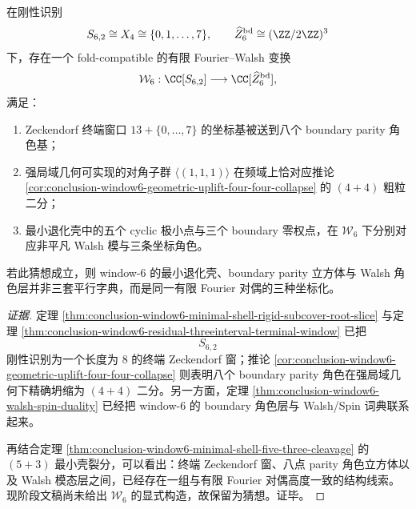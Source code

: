 \begin{conjecture}\label{conj:conclusion-window6-walsh-zeckendorf-duality}
在刚性识别
\[
S_{6,2}\cong X_4\cong \{0,1,\dots,7\},
\qquad
\widehat Z_6^{\mathrm{bd}}\cong (\ZZ/2\ZZ)^3
\]
下，存在一个 fold-compatible 的有限 Fourier--Walsh 变换
\[
\mathcal W_6:\CC[S_{6,2}]\longrightarrow \CC[\widehat Z_6^{\mathrm{bd}}],
\]
满足：
\begin{enumerate}
  \item Zeckendorf 终端窗口 \(13+\{0,\dots,7\}\) 的坐标基被送到八个 boundary parity 角色基；
  \item 强局域几何可实现的对角子群 \(\langle(1,1,1)\rangle\) 在频域上恰对应推论 \ref{cor:conclusion-window6-geometric-uplift-four-four-collapse} 的 \((4+4)\) 粗粒二分；
  \item 最小退化壳中的五个 cyclic 极小点与三个 boundary 零权点，在 \(\mathcal W_6\) 下分别对应非平凡 Walsh 模与三条坐标角色。
\end{enumerate}
若此猜想成立，则 window-\(6\) 的最小退化壳、boundary parity 立方体与 Walsh 角色层并非三套平行字典，而是同一有限 Fourier 对偶的三种坐标化。
\end{conjecture}
\begin{proof}[证据]
定理 \ref{thm:conclusion-window6-minimal-shell-rigid-subcover-root-slice} 与定理 \ref{thm:conclusion-window6-residual-threeinterval-terminal-window} 已把
\[
S_{6,2}
\]
刚性识别为一个长度为 \(8\) 的终端 Zeckendorf 窗；推论 \ref{cor:conclusion-window6-geometric-uplift-four-four-collapse} 则表明八个 boundary parity 角色在强局域几何下精确坍缩为 \((4+4)\) 二分。另一方面，定理 \ref{thm:conclusion-window6-walsh-spin-duality} 已经把 window-\(6\) 的 boundary 角色层与 Walsh/Spin 词典联系起来。

再结合定理 \ref{thm:conclusion-window6-minimal-shell-five-three-cleavage} 的 \((5+3)\) 最小壳裂分，可以看出：终端 Zeckendorf 窗、八点 parity 角色立方体以及 Walsh 模态层之间，已经存在一组与有限 Fourier 对偶高度一致的结构线索。现阶段文稿尚未给出 \(\mathcal W_6\) 的显式构造，故保留为猜想。证毕。
\end{proof}
